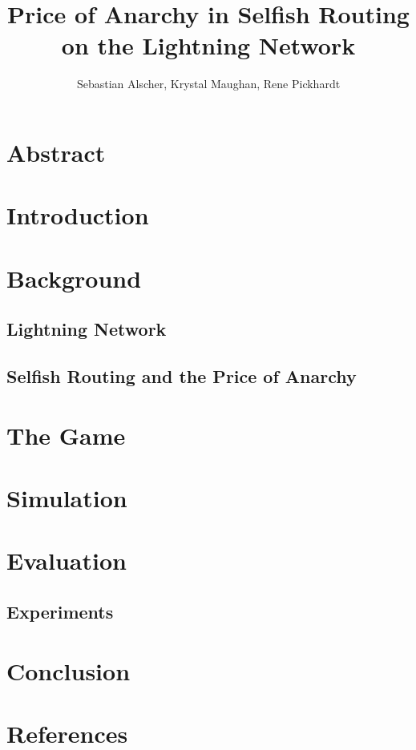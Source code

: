 \documentclass[10pt]{article}
\title{Price of Anarchy in Selfish Routing on the Lightning Network}
\author{Sebastian Alscher, Krystal Maughan, Rene Pickhardt}
\date{}
\newcommand{\mynote}[2]
    {{\color{red} \fbox{\bfseries\sffamily\scriptsize#1}
    {\small$\blacktriangleright$\textsf{\emph{#2}}$\blacktriangleleft$}}~}
\newcommand{\jn}[1]{\mynote{JN}{#1}}
\renewcommand{\jn}[1]{}
\begin{document}
\maketitle


\section*{Abstract}

\section*{Introduction}

\section*{Background}
\subsection{Lightning Network}
\subsection{Selfish Routing and the Price of Anarchy}

\section*{The Game}

\section*{Simulation}

\section{Evaluation}

\subsection{Experiments}

\section{Conclusion}

\section*{References}
\end{document}
